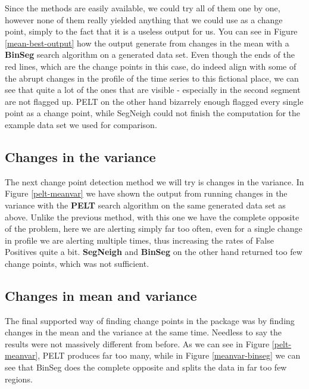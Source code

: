 \documentclass[minf,twoside,singlespacing,parskip,frontabs,notimes,12pt]{infthesis} %
\begin{document}
Since the methods are easily available, we could try all of them one by one, however none of them really yielded anything that we could use as a change point, simply to the fact that it is a useless output for us.  You can see in Figure \ref{mean-best-output} how the output generate from changes in the mean with a \textbf{BinSeg} search algorithm on a generated data set. Even though the ends of the red lines, which are the change points in this case, do indeed align with some of the abrupt changes in the profile of the time series to this fictional place, we can see that quite a lot of the ones that are visible - especially in the second segment are not flagged up. PELT on the other hand bizarrely enough flagged every single point as a change point, while SegNeigh could not finish the computation for the example data set we used for comparison. 


\subsection{Changes in the variance}

The next change point detection method we will try is changes in the variance. In Figure \ref{pelt-meanvar} we have shown the output from running changes in the variance with the \textbf{PELT} search algorithm on the same generated data set as above. Unlike the previous method, with this one we have the complete opposite of the problem, here we are alerting simply far too often, even for a single change in profile we are alerting multiple times, thus increasing the rates of False Positives quite a bit. 
 \textbf{SegNeigh} and  \textbf{BinSeg} on the other hand returned too few change points, which was not sufficient. 


\subsection{Changes in mean and variance}

The final supported way of finding change points in the package was by finding changes in the mean and the variance at the same time. Needless to say the results were not massively different from before. As we can see in Figure \ref{pelt-meanvar}, PELT produces far too many, while in Figure \ref{meanvar-binseg} we can see that BinSeg does the complete opposite and splits the data in far too few regions. 
\end{document}
